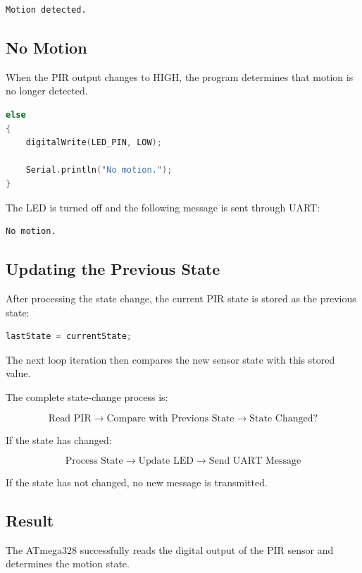 \documentclass[12pt,a4paper]{article}
\begin{document}
\begin{lstlisting}
Motion detected.
\end{lstlisting}

\subsection{No Motion}

When the PIR output changes to HIGH, the program determines that
motion is no longer detected.

\begin{lstlisting}[language=C]
else
{
    digitalWrite(LED_PIN, LOW);

    Serial.println("No motion.");
}
\end{lstlisting}

The LED is turned off and the following message is sent through UART:

\begin{lstlisting}
No motion.
\end{lstlisting}

\subsection{Updating the Previous State}

After processing the state change, the current PIR state is stored as
the previous state:

\begin{lstlisting}[language=C]
lastState = currentState;
\end{lstlisting}

The next loop iteration then compares the new sensor state with this
stored value.

The complete state-change process is:

\[
\text{Read PIR}
\rightarrow
\text{Compare with Previous State}
\rightarrow
\text{State Changed?}
\]

If the state has changed:

\[
\text{Process State}
\rightarrow
\text{Update LED}
\rightarrow
\text{Send UART Message}
\]

If the state has not changed, no new message is transmitted.

\subsection{Result}

The ATmega328 successfully reads the digital output of the PIR sensor
and determines the motion state.
\end{document}
